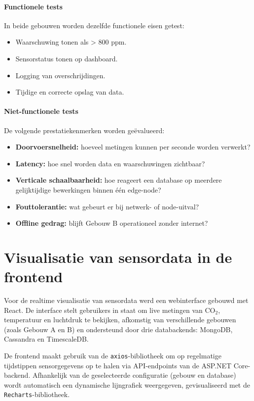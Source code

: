 \paragraph{Functionele tests}
In beide gebouwen worden dezelfde functionele eisen getest:
\begin{itemize}
    \item Waarschuwing tonen als  > 800 ppm.
    \item Sensorstatus tonen op dashboard.
    \item Logging van overschrijdingen.
    \item Tijdige en correcte opslag van data.
\end{itemize}

\paragraph{Niet-functionele tests}
De volgende prestatiekenmerken worden geëvalueerd:
\begin{itemize}
    \item \textbf{Doorvoersnelheid:} hoeveel metingen kunnen per seconde worden verwerkt?
    \item \textbf{Latency:} hoe snel worden data en waarschuwingen zichtbaar?
    \item \textbf{Verticale schaalbaarheid:} hoe reageert een database op meerdere gelijktijdige bewerkingen binnen één edge-node?
    \item \textbf{Fouttolerantie:} wat gebeurt er bij netwerk- of node-uitval?
    \item \textbf{Offline gedrag:} blijft Gebouw B operationeel zonder internet?
\end{itemize}

\section{Visualisatie van sensordata in de frontend}

Voor de realtime visualisatie van sensordata werd een webinterface gebouwd met React.
 De interface stelt gebruikers in staat om live metingen van CO$_2$, temperatuur en luchtdruk te bekijken, afkomstig van verschillende gebouwen (zoals Gebouw A en B) en ondersteund door drie databackends: MongoDB, Cassandra en TimescaleDB.

De frontend maakt gebruik van de \texttt{axios}-bibliotheek om op regelmatige tijdstippen sensorgegevens op te halen via API-endpoints van de ASP.NET Core-backend.
 Afhankelijk van de geselecteerde configuratie (gebouw en database) wordt automatisch een dynamische lijngrafiek weergegeven, gevisualiseerd met de \texttt{Recharts}-bibliotheek.

